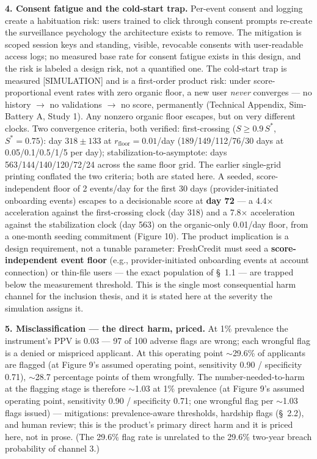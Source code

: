 \documentclass[11pt,twocolumn]{article}
\begin{document}
\textbf{4. Consent fatigue and the cold-start trap.} Per-event consent and logging create a habituation risk: users trained to click through consent prompts re-create the surveillance psychology the architecture exists to remove. The mitigation is scoped session keys and standing, visible, revocable consents with user-readable access logs; no measured base rate for consent fatigue exists in this design, and the risk is labeled a design risk, not a quantified one. The cold-start trap is measured [SIMULATION] and is a first-order product risk: under score-proportional event rates with zero organic floor, a new user \emph{never} converges --- no history $\rightarrow$ no validations $\rightarrow$ no score, permanently (Technical Appendix, Sim-Battery A, Study 1). Any nonzero organic floor escapes, but on very different clocks. Two convergence criteria, both verified: first-crossing ($S \geq 0.9\,S^*$, $S^* = 0.75$): day $318 \pm 133$ at $r_{\mathrm{floor}} = 0.01$/day (189/149/112/76/30 days at 0.05/0.1/0.5/1/5 per day); stabilization-to-asymptote: days 563/144/140/120/72/24 across the same floor grid. The earlier single-grid printing conflated the two criteria; both are stated here. A seeded, score-independent floor of 2 events/day for the first 30 days (provider-initiated onboarding events) escapes to a decisionable score at \textbf{day 72} --- a 4.4$\times$ acceleration against the first-crossing clock (day 318) and a 7.8$\times$ acceleration against the stabilization clock (day 563) on the organic-only 0.01/day floor, from a one-month seeding commitment (Figure 10). The product implication is a design requirement, not a tunable parameter: FreshCredit must seed a \textbf{score-independent event floor} (e.g., provider-initiated onboarding events at account connection) or thin-file users --- the exact population of \S~1.1 --- are trapped below the measurement threshold. This is the single most consequential harm channel for the inclusion thesis, and it is stated here at the severity the simulation assigns it.

\textbf{5. Misclassification --- the direct harm, priced.} At 1\% prevalence the instrument's PPV is 0.03 --- 97 of 100 adverse flags are wrong; each wrongful flag is a denied or mispriced applicant. At this operating point $\sim$29.6\% of applicants are flagged (at Figure 9's assumed operating point, sensitivity 0.90 / specificity 0.71), $\sim$28.7 percentage points of them wrongfully. The number-needed-to-harm at the flagging stage is therefore $\sim$1.03 at 1\% prevalence (at Figure 9's assumed operating point, sensitivity 0.90 / specificity 0.71; one wrongful flag per $\sim$1.03 flags issued) --- mitigations: prevalence-aware thresholds, hardship flags (\S~2.2), and human review; this is the product's primary direct harm and it is priced here, not in prose. (The 29.6\% flag rate is unrelated to the 29.6\% two-year breach probability of channel 3.)
\end{document}

